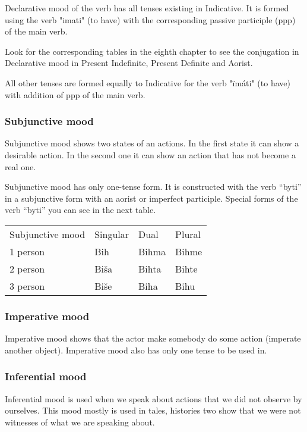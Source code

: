 Declarative mood of the verb has all tenses existing in Indicative. It is formed using the verb "imati" (to have) with the corresponding passive participle (\gls{ppp}) of the main verb.

Look for the corresponding tables in the eighth chapter to see the conjugation in Declarative mood in Present Indefinite, Present Definite and Aorist.

All other tenses are formed equally to Indicative for the verb "ïmáti" (to have) with addition of \gls{ppp} of the main verb.

\subsubsection{Subjunctive mood}

Subjunctive mood shows two states of an actions. In the first state it can show a desirable action. In the second one it can show an action that has not become a real one. 

Subjunctive mood has only one-tense form. It is constructed with the verb “byti” in a subjunctive form with an aorist or imperfect participle. Special forms of the verb “byti” you can see in the next table.

\begin{table}[!htb]
	\begin{tabular}{llll}
		Subjunctive mood & Singular & Dual & Plural \\
		1 person & Bih & Bihma & Bihme \\
		2 person & Biša & Bihta & Bihte \\
		3 person & Biše & Biha & Bihu
	\end{tabular}
\end{table}

\subsubsection{Imperative mood}

Imperative mood shows that the actor make somebody do some action (imperate another object). Imperative mood also has only one tense to be used in. 

\subsubsection{Inferential mood}

Inferential mood is used when we speak about actions that we did not observe by ourselves. This mood mostly is used in tales, histories two show that we were not witnesses of what we are speaking about.

